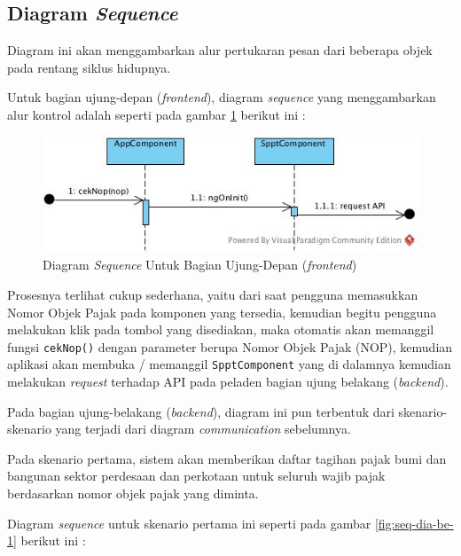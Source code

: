 \documentclass[pdftex,12pt, oneside]{article}
\begin{document}
\subsection{Diagram \textit{Sequence}}

Diagram ini akan menggambarkan alur pertukaran pesan dari beberapa objek pada rentang siklus hidupnya. 

Untuk bagian ujung-depan (\textit{frontend}), diagram \textit{sequence} yang menggambarkan alur kontrol adalah seperti pada gambar \ref{fig:seq-dia-fe} berikut ini :

\begin{figure}[H]
	\centering
	\includegraphics[width=1\textwidth]{./resources/seq-dia-fe}
	\caption{Diagram \textit{Sequence} Untuk Bagian Ujung-Depan (\textit{frontend})}
	\label{fig:seq-dia-fe}
\end{figure}

Prosesnya terlihat cukup sederhana, yaitu dari saat pengguna memasukkan Nomor Objek Pajak pada komponen yang tersedia, kemudian begitu pengguna melakukan klik pada tombol yang disediakan, maka otomatis akan memanggil fungsi \texttt{cekNop()} dengan parameter berupa Nomor Objek Pajak (NOP), kemudian aplikasi akan membuka / memanggil \texttt{SpptComponent} yang di dalamnya kemudian melakukan \textit{request} terhadap API pada peladen bagian ujung belakang (\textit{backend}).

Pada bagian ujung-belakang (\textit{backend}), diagram ini pun terbentuk dari skenario-skenario yang terjadi dari diagram \textit{communication} sebelumnya.

Pada skenario pertama, sistem akan memberikan daftar tagihan pajak bumi dan bangunan sektor perdesaan dan perkotaan untuk seluruh wajib pajak berdasarkan nomor objek pajak yang diminta.

Diagram \textit{sequence} untuk skenario pertama ini seperti pada gambar \ref{fig:seq-dia-be-1} berikut ini :
\end{document}

